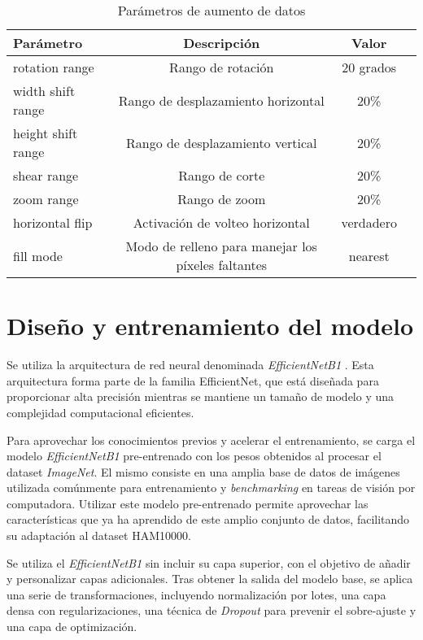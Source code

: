 \begin{table}[ht]
   \centering
   \begin{tabular}{lccc}
   \hline
   Parámetro & Descripción  & Valor \\ \hline
   rotation range & 	Rango de rotación & 20 grados \\
   width shift range & Rango de desplazamiento horizontal & 20\% \\
   height shift range & Rango de desplazamiento vertical & 20\% \\
   shear range & 	Rango de corte & 20\% \\
   zoom range & Rango de zoom & 20\% \\
   horizontal flip & Activación de volteo horizontal & verdadero \\
   fill mode & Modo de relleno para manejar los píxeles faltantes & nearest \\ \hline
   \end{tabular}
   \caption{Parámetros de aumento de datos}
   \label{tab:data_augmentation_params}
   \end{table}

   \section{Diseño y entrenamiento del modelo}

   Se utiliza la arquitectura de red neural denominada \textit{EfficientNetB1} . Esta arquitectura forma parte de la familia EfficientNet, que está diseñada para proporcionar alta precisión mientras se mantiene un tamaño de modelo y una complejidad computacional eficientes.
   
   Para aprovechar los conocimientos previos y acelerar el entrenamiento, se carga el modelo \textit{EfficientNetB1} pre-entrenado con los pesos obtenidos al procesar el dataset \textit{ImageNet}. El mismo consiste en una amplia base de datos de imágenes utilizada comúnmente para entrenamiento y \textit{benchmarking} en tareas de visión por computadora. Utilizar este modelo pre-entrenado permite aprovechar las características que ya ha aprendido de este amplio conjunto de datos, facilitando su adaptación al dataset HAM10000.
   
   Se utiliza el \textit{EfficientNetB1} sin incluir su capa superior, con el objetivo de añadir y personalizar capas adicionales. Tras obtener la salida del modelo base, se aplica una serie de transformaciones, incluyendo normalización por lotes, una capa densa con regularizaciones, una técnica de \textit{Dropout} para prevenir el sobre-ajuste y una capa de optimización. 
   
